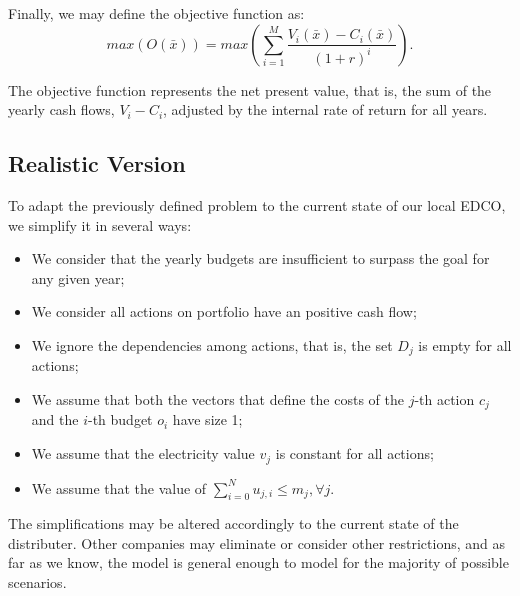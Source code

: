 Finally, we may define the objective function as:
\begin{equation}
    \label{eq:objective}
    max(O(\bar{x})) = max\left(\sum_{i=1}^{M} \frac{V_i(\bar{x}) - C_i(\bar{x})}{(1+r)^i}\right).
\end{equation}

The objective function represents the net present value, that is,
the sum of the yearly cash flows, $V_i - C_i$, adjusted by the internal rate of return for all years.

\subsection{Realistic Version}

To adapt the previously defined problem to the current state of our local EDCO, we simplify it in several  ways:

\begin{itemize}
\item We consider that the yearly budgets are insufficient to surpass the goal for any given year;

\item We consider all actions on portfolio have an positive cash flow;

\item We ignore the dependencies among actions, that is, the set $D_j$ is empty
for all actions; %

\item We assume that both the vectors that define the costs of the $j$-th  action $c_j$
and the $i$-th budget $o_i$ have size 1;%

\item We assume that the electricity  value $v_j$ is constant for all actions;

\item We assume that the value of $\sum_{i=0}^{N} u_{j,i} \leq m_j, \forall j$.

\end{itemize}

The simplifications may be altered accordingly to the current
state of the distributer. Other companies may eliminate or consider other restrictions,
and as far as we know, the model is general enough to model for the
majority of possible scenarios.





